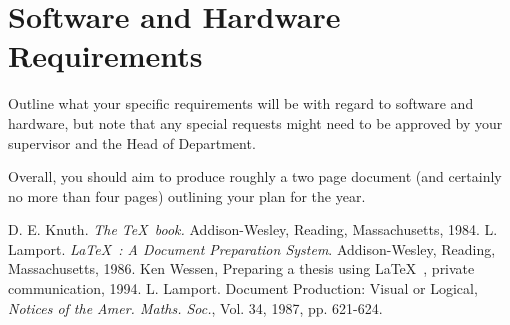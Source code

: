 \documentclass[12pt, a4paper]{article}
\begin{document}
\section*{Software and Hardware Requirements}
Outline what your specific requirements will be with regard
to software and hardware, but note that any special requests
might need to be approved by your supervisor and the Head of
Department.

Overall, you should aim to produce roughly a two page document
(and certainly no more than four pages)
outlining your plan for the year.

\begin{thebibliography}{9}
 D. E. Knuth. {\em The \TeX~book.}\/ Addison-Wesley,
Reading, Massachusetts, 1984.
 L. Lamport. {\em \LaTeX~: A Document Preparation
System}.\/ Addison-Wesley, Reading, Massachusetts, 1986.
 Ken Wessen, Preparing a thesis using \LaTeX~, private
communication, 1994.
 L. Lamport. Document Production: Visual
or Logical, {\em Notices of the Amer. Maths. Soc.},\/ Vol. 34,
1987, pp. 621-624.
\end{thebibliography}
\end{document}
